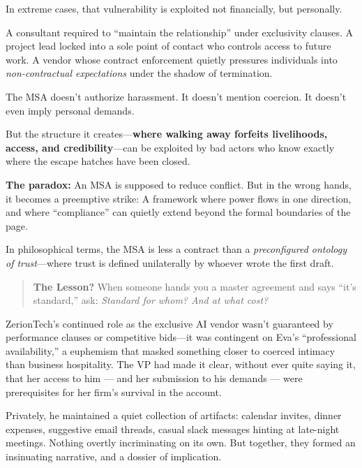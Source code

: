 \begin{tcolorbox}[colback=blue!5!white, colframe=blue!50!black, breakable,
  title={Philosophical Sidebar: The Master Service Agreement as a Weapon of Control}]
\medskip

In extreme cases, that vulnerability is exploited not financially, but personally.

A consultant required to “maintain the relationship” under exclusivity clauses.  
A project lead locked into a sole point of contact who controls access to future work.  
A vendor whose contract enforcement quietly pressures individuals into \textit{non-contractual expectations} under the shadow of termination.

\medskip

The MSA doesn’t authorize harassment.  
It doesn’t mention coercion.  
It doesn’t even imply personal demands.

But the structure it creates—\textbf{where walking away forfeits livelihoods, access, and credibility}—can be exploited by bad actors who know exactly where the escape hatches have been closed.

\medskip

\textbf{The paradox:}  
An MSA is supposed to reduce conflict.  
But in the wrong hands, it becomes a preemptive strike:  
A framework where power flows in one direction, and where “compliance” can quietly extend beyond the formal boundaries of the page.

\medskip

In philosophical terms, the MSA is less a contract than a \textit{preconfigured ontology of trust}—where trust is defined unilaterally by whoever wrote the first draft.

\medskip

\begin{quote}
\textbf{The Lesson?} When someone hands you a master agreement and says “it’s standard,” ask: \textit{Standard for whom? And at what cost?}
\end{quote}

\end{tcolorbox}

ZerionTech’s continued role as the exclusive AI vendor wasn’t guaranteed by performance clauses or competitive bids—it was contingent on Eva’s “professional availability,” a euphemism that masked something closer to coerced intimacy than business hospitality. The VP had made it clear, without ever quite saying it, that her access to him --- and her submission to his demands --- were prerequisites for her firm’s survival in the account.

Privately, he maintained a quiet collection of artifacts: calendar invites, dinner expenses, suggestive email threads, casual slack messages hinting at late-night meetings. Nothing overtly incriminating on its own. But together, they formed an insinuating narrative, and a dossier of implication.

